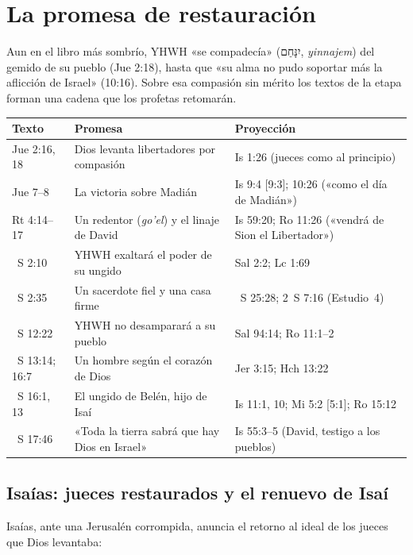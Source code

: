 \documentclass[11pt,letterpaper]{article}
\newcommand{\heb}[1]{\mbox{\foreignlanguage{hebrew}{#1}}}
\begin{document}
\section{La promesa de restauración}

Aun en el libro más sombrío, YHWH «se compadecía» (\heb{יִנָּחֵם}, \emph{yinnajem}) del gemido de su pueblo (Jue 2:18), hasta que «su alma no pudo soportar más la aflicción de Israel» (10:16). Sobre esa compasión sin mérito los textos de la etapa forman una cadena que los profetas retomarán.

\begin{center}\small
\renewcommand{\arraystretch}{1.25}
\begin{tabular}{>{\RaggedRight\arraybackslash}p{2.6cm}>{\RaggedRight\arraybackslash}p{5.0cm}>{\RaggedRight\arraybackslash}p{6.3cm}}
\toprule
\textbf{Texto} & \textbf{Promesa} & \textbf{Proyección}\\
\midrule
Jue 2:16, 18 & Dios levanta libertadores por compasión & Is 1:26 (jueces como al principio)\\
Jue 7--8 & La victoria sobre Madián & Is 9:4 [9:3]; 10:26 («como el día de Madián»)\\
Rt 4:14--17 & Un redentor (\emph{go'el}) y el linaje de David & Is 59:20; Ro 11:26 («vendrá de Sion el Libertador»)\\
1~S 2:10 & YHWH exaltará el poder de su ungido & Sal 2:2; Lc 1:69\\
1~S 2:35 & Un sacerdote fiel y una casa firme & 1~S 25:28; 2~S 7:16 (Estudio~4)\\
1~S 12:22 & YHWH no desamparará a su pueblo & Sal 94:14; Ro 11:1--2\\
1~S 13:14; 16:7 & Un hombre según el corazón de Dios & Jer 3:15; Hch 13:22\\
1~S 16:1, 13 & El ungido de Belén, hijo de Isaí & Is 11:1, 10; Mi 5:2 [5:1]; Ro 15:12\\
1~S 17:46 & «Toda la tierra sabrá que hay Dios en Israel» & Is 55:3--5 (David, testigo a los pueblos)\\
\bottomrule
\end{tabular}\end{center}

\subsection{Isaías: jueces restaurados y el renuevo de Isaí}
Isaías, ante una Jerusalén corrompida, anuncia el retorno al ideal de los jueces que Dios levantaba:
\end{document}
